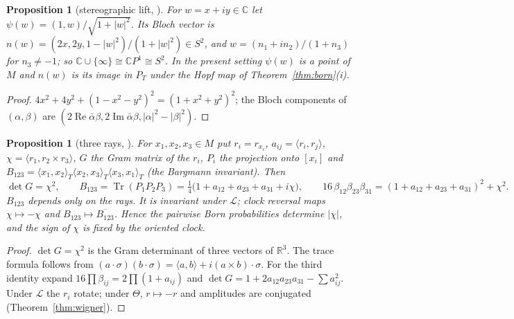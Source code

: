 \documentclass[aps,pra,onecolumn,superscriptaddress,nofootinbib,10pt]{revtex4-2}
\newtheorem{proposition}[theorem]{Proposition}
\theoremstyle{definition}
\theoremstyle{remark}
\newcommand{\R}{\mathbb{R}}
\newcommand{\C}{\mathbb{C}}
\newcommand{\cL}{\mathcal{L}}
\newcommand{\re}{\operatorname{Re}}
\newcommand{\im}{\operatorname{Im}}
\newcommand{\tr}{\operatorname{Tr}}
\newcommand{\ip}[2]{\langle #1,#2\rangle}
\begin{document}
\begin{proposition}[stereographic lift, {\cite[Prop.~4.3]{CRQO}}]\label{prop:stereo}
For $w=x+iy\in\C$ let $\psi(w)=(1,w)/\sqrt{1+\lvert w\rvert^2}$.  Its Bloch vector is
$n(w)=(2x,2y,1-\lvert w\rvert^2)/(1+\lvert w\rvert^2)\in S^2$, and $w=(n_1+in_2)/(1+n_3)$ for $n_3\ne-1$; so
$\C\cup\{\infty\}\cong\C P^1\cong S^2$.  In the present setting $\psi(w)$ is a point of $M$ and $n(w)$
is its image in $P_T$ under the Hopf map of Theorem~\ref{thm:born}(i).
\end{proposition}
\begin{proof}
$4x^2+4y^2+(1-x^2-y^2)^2=(1+x^2+y^2)^2$; the Bloch components of $(\alpha,\beta)$ are
$(2\re\bar\alpha\beta,2\im\bar\alpha\beta,\lvert\alpha\rvert^2-\lvert\beta\rvert^2)$.
\end{proof}

\begin{proposition}[three rays, {\cite[Lemma~6.2]{CRQO}}]\label{prop:threerays}
For $x_1,x_2,x_3\in M$ put $r_i=r_{x_i}$, $a_{ij}=\ip{r_i}{r_j}$, $\chi=\ip{r_1}{r_2\times r_3}$, $G$ the
Gram matrix of the $r_i$, $P_i$ the projection onto $[x_i]$ and
$B_{123}=\ip{x_1}{x_2}_T\ip{x_2}{x_3}_T\ip{x_3}{x_1}_T$ (the Bargmann invariant).  Then
\[
\det G=\chi^2,\qquad B_{123}=\tr(P_1P_2P_3)=\tfrac14\bigl(1+a_{12}+a_{23}+a_{31}+i\chi\bigr),\qquad
16\,\beta_{12}\beta_{23}\beta_{31}=(1+a_{12}+a_{23}+a_{31})^2+\chi^2 .
\]
$B_{123}$ depends only on the rays.  It is invariant under $\cL$; clock reversal maps $\chi\mapsto-\chi$
and $B_{123}\mapsto\overline{B_{123}}$.  Hence the pairwise Born probabilities determine $\lvert\chi\rvert$,
and the sign of $\chi$ is fixed by the oriented clock.
\end{proposition}
\begin{proof}
$\det G=\chi^2$ is the Gram determinant of three vectors of $\R^3$.  The trace formula follows from
$(a\cdot\sigma)(b\cdot\sigma)=\ip{a}{b}+i(a\times b)\cdot\sigma$.  For the third identity expand
$16\prod\beta_{ij}=2\prod(1+a_{ij})$ and $\det G=1+2a_{12}a_{23}a_{31}-\sum a_{ij}^2$.  Under $\cL$ the
$r_i$ rotate; under $\Theta$, $r\mapsto-r$ and amplitudes are conjugated (Theorem~\ref{thm:wigner}).
\end{proof}
\end{document}
